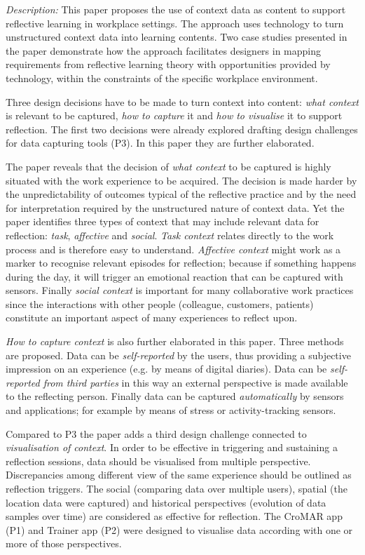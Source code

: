 \emph{Description:} This paper proposes the use of context data as content to support reflective learning in workplace settings. The approach uses technology to turn unstructured context data into learning contents. Two case studies presented in the paper demonstrate how the approach facilitates designers in mapping requirements from reflective learning theory with opportunities provided by technology, within the constraints of the specific workplace environment.

Three design decisions have to be made to turn context into content: \emph{what context} is relevant to be captured, \emph{how to capture} it and \emph{how to visualise} it to support reflection. The first two decisions were already explored drafting design challenges for data capturing tools (P3). In this paper they are further elaborated.

The paper reveals that the decision of \emph{what context} to be captured is highly situated with the work experience to be acquired. The decision is made harder by the unpredictability of outcomes typical of the reflective practice and by the need for interpretation required by the unstructured nature of context data. Yet the paper identifies three types of context that may include relevant data for reflection: \emph{task}, \emph{affective} and \emph{social}. \emph{Task context} relates directly to the work process and is therefore easy to understand. \emph{Affective context} might work as a marker to recognise relevant episodes for reflection; because if something happens during the day, it will trigger an emotional reaction that can be captured with sensors. Finally \emph{social context} is important for many collaborative work practices since the interactions with other people (colleague, customers, patients) constitute an important aspect of many experiences to reflect upon.

\emph{How to capture context} is also further elaborated in this paper. Three methods are proposed. Data can be \emph{self-reported} by the users, thus providing a subjective impression on an experience (e.g. by means of digital diaries). Data can be \emph{self-reported from third parties} in this way an external perspective is made available to the reflecting person. Finally data can be captured \emph{automatically} by sensors and applications; for example by means of stress or activity-tracking sensors.

Compared to P3 the paper adds a third design challenge connected to \emph{visualisation of context}. In order to be effective in triggering and sustaining a reflection sessions, data should be visualised from multiple perspective. Discrepancies among different view of the same experience should be outlined as reflection triggers. The social (comparing data over multiple users), spatial (the location data were captured) and historical perspectives (evolution of data samples over time) are considered as effective for reflection. The CroMAR app (P1) and Trainer app (P2) were designed to visualise data according with one or more of those perspectives.

